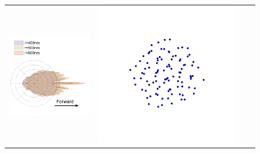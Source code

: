 \begin{figure}
    \centering
    \setlength{\resLen}{0.8in}
    \addtolength{\tabcolsep}{-3pt}
    \begin{tabular}{cccc}
        \includegraphics[width=\resLen]{images/pfunc/radius.png} &
        \includegraphics[width=\resLen]{images/particle/validate5_D2_N100_400nm.png} &

\end{tabular}
\end{figure}
